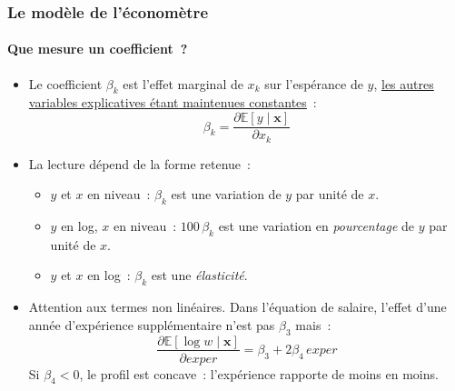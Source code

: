 \documentclass[10pt]{beamer}
\begin{document}
\begin{frame}
  \frametitle{Le modèle de l'économètre}
  \framesubtitle{Que mesure un coefficient~?}

  \begin{itemize}

  \item Le coefficient $\beta_k$ est l'effet marginal de $x_k$ sur l'espérance de $y$,
    \underline{les autres variables explicatives étant maintenues constantes}~:
    \[
      \beta_k = \frac{\partial \mathbb E\left[ y \mid \mathbf x \right]}{\partial x_k}
    \]
    \medskip

  \item La lecture dépend de la forme retenue~:
    \begin{itemize}
    \item $y$ et $x$ en niveau~: $\beta_k$ est une variation de $y$ par unité de $x$.
    \item $y$ en log, $x$ en niveau~: $100\,\beta_k$ est une variation en \emph{pourcentage}
      de $y$ par unité de $x$.
    \item $y$ et $x$ en log~: $\beta_k$ est une \emph{élasticité}.
    \end{itemize}
    \medskip

  \item Attention aux termes non linéaires. Dans l'équation de salaire, l'effet d'une
    année d'expérience supplémentaire n'est pas $\beta_3$ mais~:
    \[
      \frac{\partial \mathbb E\left[ \log w \mid \mathbf x \right]}{\partial exper}
      = \beta_3 + 2\beta_4\, exper
    \]
    Si $\beta_4<0$, le profil est concave~: l'expérience rapporte de moins en moins.

  \end{itemize}

\end{frame}
\end{document}
